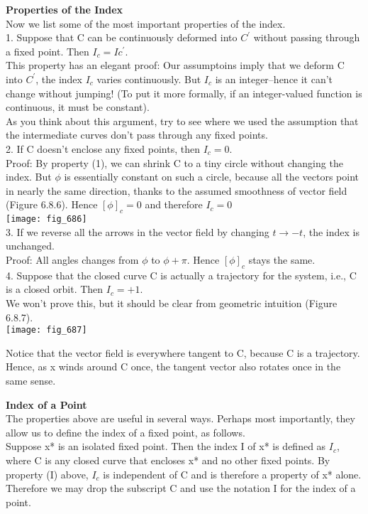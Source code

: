 \documentclass{article}
\newcommand\tab[1][1cm]{\hspace*{#1}}
\begin{document}
\textbf{Properties of the Index} \\ \tab
Now we list some of the most important properties of the index. \\ \tab
1. Suppose that C can be continuously deformed into $C^{'}$ without passing through a fixed point. Then $I_{c}=I{c^{'}}$. \\ \tab
This property has an elegant proof: Our assumptoins imply that we deform C into $C^{'}$, the index $I_{c}$ varies continuously. But $I_{c}$ is an integer--hence it can't change without jumping! (To put it more formally, if an integer-valued function is continuous, it must be constant). \\ \tab
As you think about this argument, try to see where we used the assumption that the intermediate curves don't pass through any fixed points. \\ \tab
2. If C doesn't enclose any fixed points, then $I_{c} = 0$. \\ \tab
Proof: By property (1), we can shrink C to a tiny circle without changing the index. But $\phi$ is essentially constant on such a circle, because all the vectors point in nearly the same direction, thanks to the assumed smoothness of vector field (Figure 6.8.6). Hence $[\phi]_{c}=0$ and therefore $I_{c}=0$ \\

\texttt{[image: fig\_686]}
\\ \tab 
3. If we reverse all the arrows in the vector field by changing $t \to -t$, the index is unchanged. \\ \tab
Proof: All angles changes from $\phi$ to $\phi+\pi$. Hence $[\phi]_{c}$ stays the same. \\ \tab
4. Suppose that the closed curve C is actually a trajectory for the system, i.e., C is a closed orbit. Then $I_{c}=+1$. \\ \tab
We won't prove this, but it should be clear from geometric intuition (Figure 6.8.7).
\\
\texttt{[image: fig\_687]}

Notice that the vector field is everywhere tangent to C, because C is a trajectory. Hence, as x winds around C once, the tangent vector also rotates once in the same sense. 

\textbf {Index of a Point} \\ \tab
The properties above are useful in several ways. Perhaps most importantly, they allow us to define the index of a fixed point, as follows. \\ \tab
Suppose x* is an isolated fixed point. Then the index I of x* is defined as $I_{c}$, where C is any closed curve that encloses x* and no other fixed points. By property (I) above, $I_{c}$ is independent of C and is therefore a property of x* alone. Therefore we may drop the subscript C and use the notation I for the index of a point.
\end{document}
